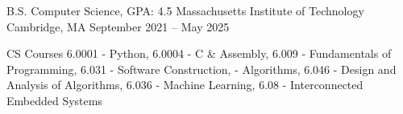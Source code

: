 \documentclass[12pt, letterpaper]{awesome-cv}
\begin{document}
\makecvheader

\begin{cventries}
  \cventry
    {B.S. Computer Science, GPA: 4.5} %
    {Massachusetts Institute of Technology} %
    {Cambridge, MA} %
    {September 2021 -- May 2025} %
    {
      \vspace{-0.11in}
      \begin{cvskills}
        \cvskill
          {CS Courses} %
          {6.0001 - Python, 6.0004 - C \& Assembly, 6.009 - Fundamentals of Programming, 6.031 - Software Construction,
           - Algorithms, 6.046 - Design and Analysis of Algorithms, 6.036 - Machine Learning, 6.08 - Interconnected Embedded Systems} %
      \end{cvskills}
    }
  \vspace{-0.2in}
\end{cventries} 
\end{document}
